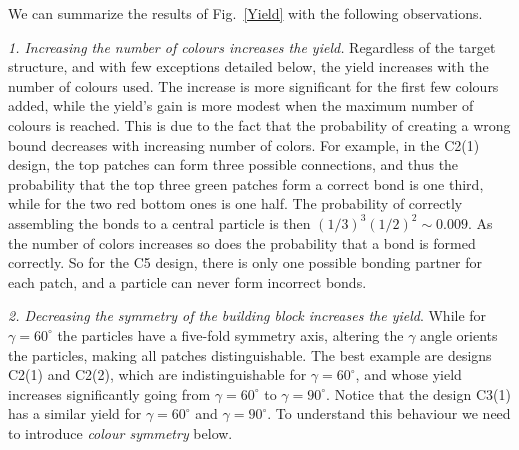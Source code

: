 \documentclass[a4paper, amsfonts, amssymb, amsmath, reprint, showkeys, nofootinbib, oneside]{revtex4-1}
\begin{document}
We can summarize the results of Fig.~\ref{Yield} with the following observations.


\noindent
\emph{1. Increasing the number of colours increases the yield.} Regardless of the target structure, and with few exceptions detailed below, the yield increases with the number of colours used. The increase is more significant for the first few colours added, while the yield's gain is more modest when the maximum number of colours is reached.
This is due to the fact that the probability of creating a wrong bound decreases with increasing number of colors. For example, in the C2(1) design, the top patches can form three possible connections, and thus the probability that the top three green patches form a correct bond is one third, while for the two red bottom ones is one half. The probability of correctly assembling the bonds to a central particle is then $(1/3)^3 (1/2)^2\sim 0.009$. As the number of colors increases so does the probability that a bond is formed correctly. So for the C5 design, there is only one possible bonding partner for each patch, and a particle can never form incorrect bonds.

\noindent
\emph{2. Decreasing the symmetry of the building block increases the yield}. While for $\gamma=60^\circ$ the particles have a five-fold symmetry axis, altering the $\gamma$ angle orients the particles, making all patches distinguishable. The best example are designs C2(1) and C2(2), which are indistinguishable for $\gamma=60^\circ$, and whose yield increases significantly going from $\gamma=60^\circ$ to $\gamma=90^\circ$. Notice that the design C3(1) has a similar yield for $\gamma=60^\circ$ and $\gamma=90^\circ$. To understand this behaviour we need to introduce \emph{colour symmetry} below.
\end{document}
